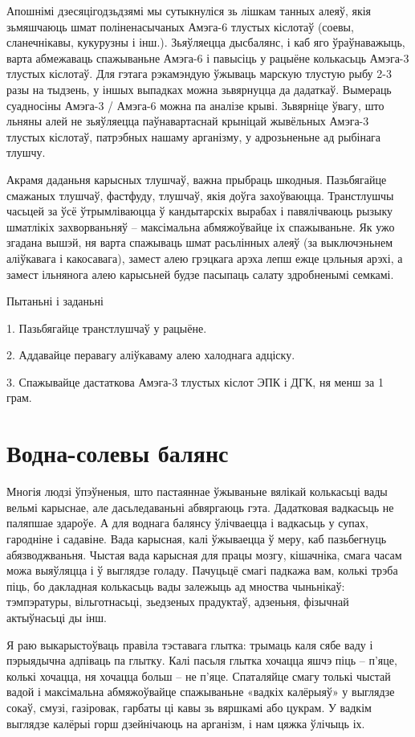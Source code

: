 Апошнімі дзесяцігодзьдзямі мы сутыкнуліся зь лішкам танных алеяў, якія зьмяшчаюць шмат поліненасычаных Амэга-6 тлустых кіслотаў (соевы, сланечнікавы, кукурузны і інш.). Зьяўляецца дысбалянс, і каб яго ўраўнаважыць, варта абмежаваць спажываньне Амэга-6 і павысіць у рацыёне колькасьць Амэга-3 тлустых кіслотаў. Для гэтага рэкамэндую ўжываць марскую тлустую рыбу 2-3 разы на тыдзень, у іншых выпадках можна зьвярнуцца да дадаткаў. Вымераць суадносіны Амэга-3 / Амэга-6 можна па аналізе крыві. Зьвярніце ўвагу, што льняны алей не зьяўляецца паўнавартаснай крыніцай жывёльных Амэга-3 тлустых кіслотаў, патрэбных нашаму арганізму, у адрозьненьне ад рыбінага тлушчу.

Акрамя даданьня карысных тлушчаў, важна прыбраць шкодныя. Пазьбягайце смажаных тлушчаў, фастфуду, тлушчаў, якія доўга захоўваюцца. Транстлушчы часьцей за ўсё ўтрымліваюцца ў кандытарскіх вырабах і павялічваюць рызыку шматлікіх захворваньняў – максімальна абмяжоўвайце іх спажываньне. Як ужо згадана вышэй, ня варта спажываць шмат расьлінных алеяў (за выключэньнем аліўкавага і какосавага), замест алею грэцкага арэха лепш ежце цэльныя арэхі, а замест ільнянога алею карысьней будзе пасыпаць салату здробненымі семкамі.

Пытаньні і заданьні

1. Пазьбягайце транстлушчаў у рацыёне.

2. Аддавайце перавагу аліўкаваму алею халоднага адціску.

3. Спажывайце дастаткова Амэга-3 тлустых кіслот ЭПК і ДГК, ня менш за 1 грам.


\section{Водна-солевы балянс}

Многія людзі ўпэўненыя, што пастаяннае ўжываньне вялікай колькасьці вады вельмі карыснае, але дасьледаваньні абвяргаюць гэта. Дадатковая вадкасьць не паляпшае здароўе. А для воднага балянсу ўлічваецца і вадкасьць у супах, гародніне і садавіне. Вада карысная, калі ўжываецца ў меру, каб пазьбегнуць абязводжваньня. Чыстая вада карысная для працы мозгу, кішачніка, смага часам можа выяўляцца і ў выглядзе голаду. Пачуцьцё смагі падкажа вам, колькі трэба піць, бо дакладная колькасьць вады залежыць ад мноства чыньнікаў: тэмпэратуры, вільготнасьці, зьедзеных прадуктаў, адзеньня, фізычнай актыўнасьці ды інш.

Я раю выкарыстоўваць правіла тэставага глытка: трымаць каля сябе ваду і пэрыядычна адпіваць па глытку. Калі пасьля глытка хочацца яшчэ піць – п'яце, колькі хочацца, ня хочацца больш – не п'яце. Спаталяйце смагу толькі чыстай вадой і максімальна абмяжоўвайце спажываньне «вадкіх калёрыяў» у выглядзе сокаў, смузі, газіровак, гарбаты ці кавы зь вяршкамі або цукрам. У вадкім выглядзе калёрыі горш дзейнічаюць на арганізм, і нам цяжка ўлічыць іх.

